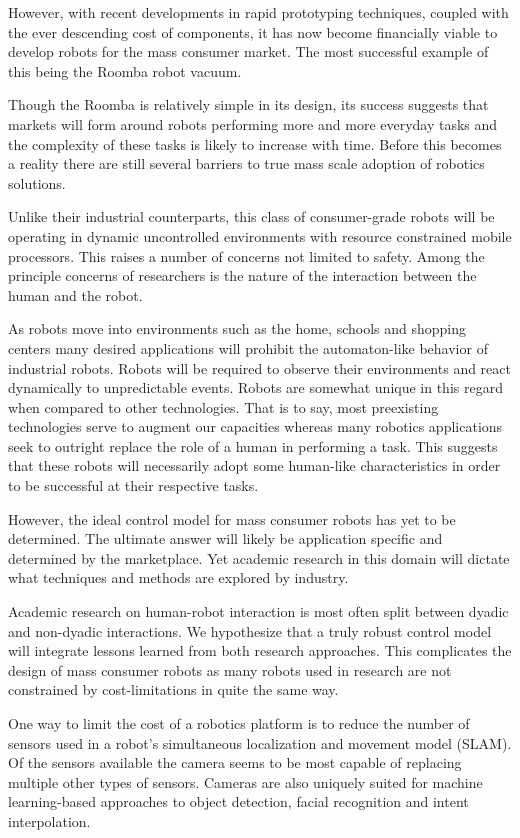 \documentclass[conference]{IEEEtran}
\begin{document}
However, with recent developments in rapid prototyping techniques, coupled with the ever descending cost of components, it has now become financially viable to develop robots for the mass consumer market. The most successful example of this being the Roomba robot vacuum\cite{b2}.

Though the Roomba is relatively simple in its design, its success suggests that markets will form around robots performing more and more everyday tasks and the complexity of these tasks is likely to increase with time. Before this becomes a reality there are still several barriers to true mass scale adoption of robotics solutions.

Unlike their industrial counterparts, this class of consumer-grade robots will be operating in dynamic uncontrolled environments with resource constrained mobile processors. This raises a number of concerns not limited to safety. Among the principle concerns of researchers is the nature of the interaction between the human and the robot\cite{b3}.

As robots move into environments such as the home, schools and shopping centers many desired applications will prohibit the automaton-like behavior of industrial robots\cite{b4}. Robots will be required to observe their environments and react dynamically to unpredictable events. Robots are somewhat unique in this regard when compared to other technologies. That is to say, most preexisting technologies serve to augment our capacities whereas many robotics applications seek to outright replace the role of a human in performing a task. This suggests that these robots will necessarily adopt some human-like characteristics in order to be successful at their respective tasks.

However, the ideal control model for mass consumer robots has yet to be determined. The ultimate answer will likely be application specific and determined by the marketplace. Yet academic research in this domain will dictate what techniques and methods are explored by industry.

Academic research on human-robot interaction is most often split between dyadic and non-dyadic interactions\cite{b3}. We hypothesize that a truly robust control model will integrate lessons learned from both research approaches. This complicates the design of mass consumer robots as many robots used in research are not constrained by cost-limitations in quite the same way.

One way to limit the cost of a robotics platform is to reduce the number of sensors used in a robot's simultaneous localization and movement model (SLAM). Of the sensors available the camera seems to be most capable of replacing multiple other types of sensors. Cameras are also uniquely suited for machine learning-based approaches to object detection, facial recognition and intent interpolation.
\end{document}
